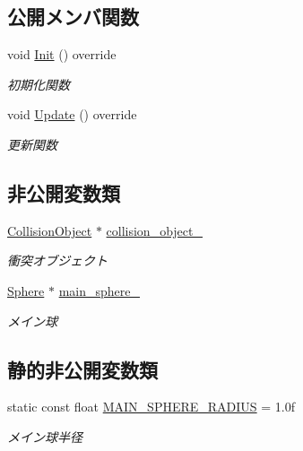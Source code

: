 \subsection*{公開メンバ関数}
\begin{DoxyCompactItemize}
\item 
void \mbox{\hyperlink{class_needle_collision_ae8084bdfa91ae1a7accfee33e31d429b}{Init}} () override
\begin{DoxyCompactList}\small\item\em 初期化関数 \end{DoxyCompactList}\item 
void \mbox{\hyperlink{class_needle_collision_a9226bcc45aa952abcafa56c7af8c8627}{Update}} () override
\begin{DoxyCompactList}\small\item\em 更新関数 \end{DoxyCompactList}\end{DoxyCompactItemize}
\subsection*{非公開変数類}
\begin{DoxyCompactItemize}
\item 
\mbox{\hyperlink{class_collision_object}{Collision\+Object}} $\ast$ \mbox{\hyperlink{class_needle_collision_a67e818d495de2f8b7ee623f76c793771}{collision\+\_\+object\+\_\+}}
\begin{DoxyCompactList}\small\item\em 衝突オブジェクト \end{DoxyCompactList}\item 
\mbox{\hyperlink{class_sphere}{Sphere}} $\ast$ \mbox{\hyperlink{class_needle_collision_ac99f319bdcc48ff3057096ba8b8b8f35}{main\+\_\+sphere\+\_\+}}
\begin{DoxyCompactList}\small\item\em メイン球 \end{DoxyCompactList}\end{DoxyCompactItemize}
\subsection*{静的非公開変数類}
\begin{DoxyCompactItemize}
\item 
static const float \mbox{\hyperlink{class_needle_collision_accb402dfcaa534d5ac14a01d58c1d843}{M\+A\+I\+N\+\_\+\+S\+P\+H\+E\+R\+E\+\_\+\+R\+A\+D\+I\+US}} = 1.\+0f
\begin{DoxyCompactList}\small\item\em メイン球半径 \end{DoxyCompactList}\end{DoxyCompactItemize}


